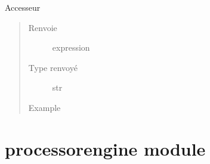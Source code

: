 \documentclass[letterpaper,10pt,french]{sphinxmanual}
\begin{document}
\begin{fulllineitems}
\begin{fulllineitems}
\begin{quote}
\begin{description}
\end{description}\end{quote}

\end{fulllineitems}


\begin{fulllineitems}
\label{\detokenize{parsertokens:parsertokens.TokenVariable.value}}
Accesseur
\begin{quote}\begin{description}
\item[{Renvoie}] \leavevmode
expression

\item[{Type renvoyé}] \leavevmode
str

\item[{Example}] \leavevmode
\begin{sphinxVerbatim}[commandchars=\\\{\}]
\end{sphinxVerbatim}

\end{description}\end{quote}

\end{fulllineitems}


\end{fulllineitems}



\section{processorengine module}
\label{\detokenize{processorengine:module-processorengine}}\label{\detokenize{processorengine:processorengine-module}}\label{\detokenize{processorengine::doc}}\label{\detokenize{processorengine:module-processorengine}}
\end{document}
